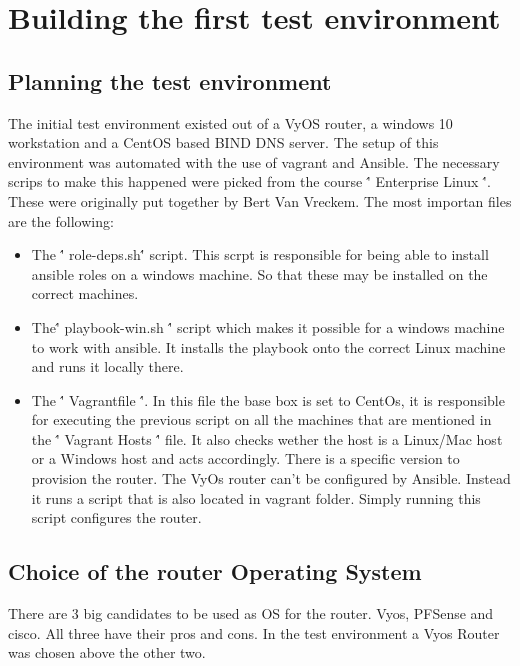 

\chapter*{Building the first test environment}
\label{ch:TestEnvironment1}

\section{Planning the test environment}
The initial test environment existed out of a VyOS router, a windows 10 workstation and a CentOS based BIND DNS server. The setup of this environment was automated with the use of vagrant and Ansible. The necessary scrips to make this happened were picked from the course \'' Enterprise Linux \''. These were originally put together by Bert Van Vreckem. The most importan files are the following:
\begin{itemize}
\item The \'' role-deps.sh\'' script. This scrpt is responsible for being able to install ansible roles on a windows machine. So that these may be installed on the correct machines.
\item The\'' playbook-win.sh \'' script which makes it possible for a windows machine to work with ansible. It installs the playbook onto the correct Linux machine and runs it locally there.
\item The \'' Vagrantfile \''. In this file the base box is set to CentOs, it is responsible for executing the previous script on all the machines that are mentioned in the \'' Vagrant Hosts \'' file. It also checks wether the host is a Linux/Mac host or a Windows host and acts accordingly. There is a specific version to provision the router. The VyOs router can't be configured by Ansible. Instead it runs a script that is also located in vagrant folder. Simply running this script configures the router.
\end {itemize}

\section{ Choice of the router Operating System }
There are 3 big candidates to be used as OS for the router. Vyos, PFSense and cisco. All three have their pros and cons. In the test environment a Vyos Router was chosen above the other two.
